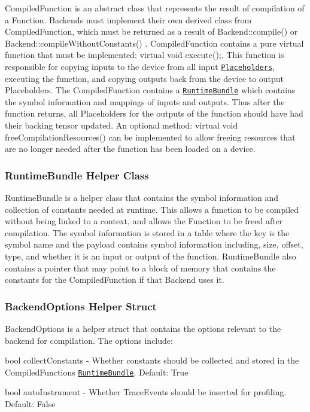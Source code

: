 {\ttfamily Compiled\+Function} is an abstract class that represents the result of compilation of a {\ttfamily Function}. Backends must implement their own derived class from {\ttfamily Compiled\+Function}, which must be returned as a result of {\ttfamily Backend\+::compile()} or {\ttfamily Backend\+::compile\+Without\+Constants()} . {\ttfamily Compiled\+Function} contains a pure virtual function that must be implemented\+: {\ttfamily virtual void execute();}. This function is responsible for copying inputs to the device from all input \href{https://github.com/pytorch/glow/blob/master/docs/IR.md#placeholders}{\tt Placeholders}, executing the function, and copying outputs back from the device to output Placeholders. The {\ttfamily Compiled\+Function} contains a \href{#runtimebundle-helper-class}{\tt Runtime\+Bundle} which contains the symbol information and mappings of inputs and outputs. Thus after the function returns, all Placeholders for the outputs of the function should have had their backing tensor updated. An optional method\+: {\ttfamily virtual void free\+Compilation\+Resources()} can be implemented to allow freeing resources that are no longer needed after the function has been loaded on a device.

\subsubsection*{{\ttfamily Runtime\+Bundle} Helper Class}

{\ttfamily Runtime\+Bundle} is a helper class that contains the symbol information and collection of constants needed at runtime. This allows a function to be compiled without being linked to a context, and allows the {\ttfamily Function} to be freed after compilation. The symbol information is stored in a table where the key is the symbol name and the payload contains symbol information including, size, offset, type, and whether it is an input or output of the function. {\ttfamily Runtime\+Bundle} also contains a pointer that may point to a block of memory that contains the constants for the {\ttfamily Compiled\+Function} if that {\ttfamily Backend} uses it.

\subsubsection*{{\ttfamily Backend\+Options} Helper Struct}

{\ttfamily Backend\+Options} is a helper struct that contains the options relevant to the backend for compilation. The options include\+:
\begin{DoxyItemize}
\item {\ttfamily bool collect\+Constants} -\/ Whether constants should be collected and stored in the {\ttfamily Compiled\+Function}\textquotesingle{}s \href{#runtimebundle-helper-class}{\tt Runtime\+Bundle}. Default\+: True
\item {\ttfamily bool auto\+Instrument} -\/ Whether {\ttfamily Trace\+Events} should be inserted for profiling. Default\+: False
\end{DoxyItemize}

